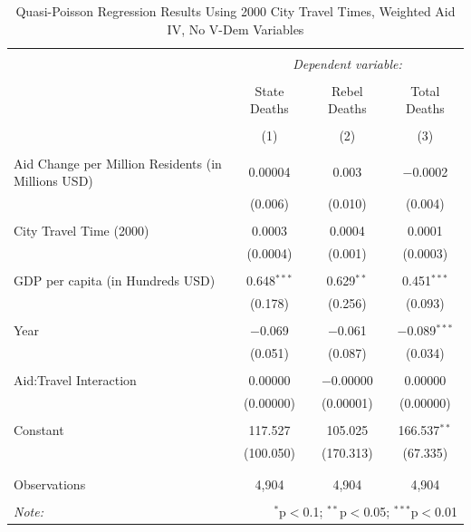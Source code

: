 \documentclass[12pt, letterpaper]{article}
\begin{document}
\begin{table}[!htbp] \centering 
	\caption{Quasi-Poisson Regression Results Using 2000 City Travel Times, Weighted Aid IV, No V-Dem Variables} 
	\label{robustweighted2000} 
	\begin{tabular}{@{\extracolsep{5pt}}lccc} 
		\\[-1.8ex]\hline 
		\hline \\[-1.8ex] 
		& \multicolumn{3}{c}{\textit{Dependent variable:}} \\ 
		\cline{2-4} 
		\\[-1.8ex] & State Deaths & Rebel Deaths & Total Deaths \\ 
		\\[-1.8ex] & (1) & (2) & (3)\\ 
		\hline \\[-1.8ex] 
		Aid Change per Million Residents (in Millions USD) & 0.00004 & 0.003 & $-$0.0002 \\ 
		& (0.006) & (0.010) & (0.004) \\ 
		& & & \\ 
		City Travel Time (2000) & 0.0003 & 0.0004 & 0.0001 \\ 
		& (0.0004) & (0.001) & (0.0003) \\ 
		& & & \\ 
		GDP per capita (in Hundreds USD) & 0.648$^{***}$ & 0.629$^{**}$ & 0.451$^{***}$ \\ 
		& (0.178) & (0.256) & (0.093) \\ 
		& & & \\ 
		Year & $-$0.069 & $-$0.061 & $-$0.089$^{***}$ \\ 
		& (0.051) & (0.087) & (0.034) \\ 
		& & & \\ 
		Aid:Travel Interaction & 0.00000 & $-$0.00000 & 0.00000 \\ 
		& (0.00000) & (0.00001) & (0.00000) \\ 
		& & & \\ 
		Constant & 117.527 & 105.025 & 166.537$^{**}$ \\ 
		& (100.050) & (170.313) & (67.335) \\ 
		& & & \\ 
		\hline \\[-1.8ex] 
		Observations & 4,904 & 4,904 & 4,904 \\ 
		\hline 
		\hline \\[-1.8ex] 
		\textit{Note:}  & \multicolumn{3}{r}{$^{*}$p$<$0.1; $^{**}$p$<$0.05; $^{***}$p$<$0.01} \\ 
	\end{tabular} 
\end{table} 
\end{document}
